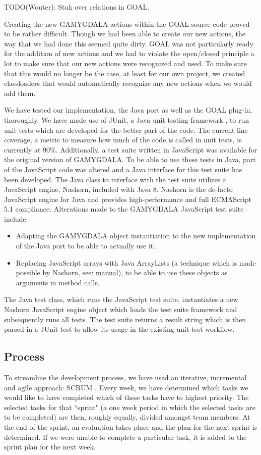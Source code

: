 TODO(Wouter): Stuk over relations in GOAL.

Creating the new GAMYGDALA actions within the GOAL source code proved to be rather difficult. Though we had been able to create our new actions, the way that we had done this seemed quite dirty. GOAL was not particularly ready for the addition of new actions and we had to violate the open/closed principle a lot to make sure that our new actions were recognized and used. To make sure that this would no longer be the case, at least for our own project, we created classloaders that would automatically recognize any new actions when we would add them.

We have tested our implementation, the Java port as well as the GOAL plug-in, thoroughly. We have made use of JUnit, a Java unit testing framework \citep{junit}, to run unit tests which are developed for the better part of the code. The current line coverage, a metric to measure how much of the code is called in unit tests, is currently at 90\%. Additionally, a test suite written in JavaScript was available for the original version of GAMYGDALA. To be able to use these tests in Java, part of the JavaScript code was altered and a Java interface for this test suite has been developed. The Java class to interface with the test suite utilizes a JavaScript engine, Nashorn, included with Java 8. Nashorn is the de-facto JavaScript engine for Java and provides high-performance \citep{projnashorn} and full ECMAScript 5.1 compliance. Alterations made to the GAMYGDALA JavaScript test suite include:
\begin{itemize}
\item Adapting the GAMYGDALA object instantiation to the new implementation of the Java port to be able to actually use it.
\item Replacing JavaScript arrays with Java ArrayLists (a technique which is made possible by Nashorn, see: \href{http://docs.oracle.com/javase/8/docs/technotes/guides/scripting/prog_guide/javascript.html#A1147187}{manual}), to be able to use these objects as arguments in method calls.
\end{itemize}
The Java test class, which runs the JavaScript test suite, instantiates a new Nashorn JavaScript engine object which loads the test suite framework and subsequently runs all tests. The test suite returns a result string which is then parsed in a JUnit test to allow its usage in the existing unit test workflow.

\subsection{Process}
To streamline the development process, we have used an iterative, incremental and agile approach: SCRUM \citep{scrum}. Every week, we have determined which tasks we would like to have completed which of these tasks have to highest priority. The selected tasks for that ``sprint" (a one week period in which the selected tasks are to be completed) are then, roughly equally, divided amongst team members. At the end of the sprint, an evaluation takes place and the plan for the next sprint is determined. If we were unable to complete a particular task, it is added to the sprint plan for the next week.


